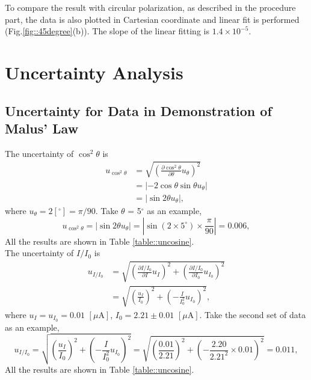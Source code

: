 \documentclass[a4paper]{article}
\begin{document}
To compare the result with circular polarization, as described in the procedure part, the data is also plotted in Cartesian coordinate and linear fit is performed (Fig.\ref{fig::45degree}(b)). The slope of the linear fitting is $1.4 \times 10^{-5}$.






\section{Uncertainty Analysis}

\subsection{Uncertainty for Data in Demonstration of Malus' Law}

The uncertainty of $\cos^2\theta$ is
\begin{align*}
	u_{\cos^{2}\theta} & =\sqrt{(\frac{\partial \cos^{2}\theta}{\partial \theta}u_{\theta})^{2}} \\
	                   & =|-2\cos\theta\sin\theta u_{\theta}|                                    \\
	                   & =|\sin2\theta u_{\theta}|,
\end{align*}
where $u_\theta = 2[^\circ] = \pi/90$. Take $\theta$ = 5$^\circ$ as an example,
$$u_{\cos^{2}\theta}=|\sin2\theta u_{\theta}|=|\sin({2\times 5^\circ})\times \frac{\pi}{90}|=0.006,$$
All the results are shown in Table \ref{table::uncosine}.\\

The uncertainty of $I/I_0$ is
\begin{align*}
	u_{I/I_{0}} & =\sqrt{(\frac{\partial I/I_0}{\partial I}u_{I})^{2}+(\frac{\partial I/I_0}{\partial I_{0}}u_{I_{0}})^{2}} \\
	            & =\sqrt{(\frac{u_{I}}{I_{0}})^{2}+(-\frac{I}{I_{0}^{2}}u_{I_{0}})^{2}},
\end{align*}
where $u_I = u_{I_0} = 0.01\,\,[\mu\text{A}]$, $I_0 = 2.21 \pm 0.01\,\,[\mu\text{A}]$. Take the second set of data as an example,
$$u_{I/I_{0}}= \sqrt{(\frac{u_{I}}{I_{0}})^{2}+(-\frac{I}{I_{0}^{2}}u_{I_{0}})^{2}}=\sqrt{(\frac{0.01}{2.21})^{2}+(-\frac{2.20}{2.21^{2}}\times 0.01)^{2}}=0.011,$$
All the results are shown in Table \ref{table::uncosine}.
\end{document}
